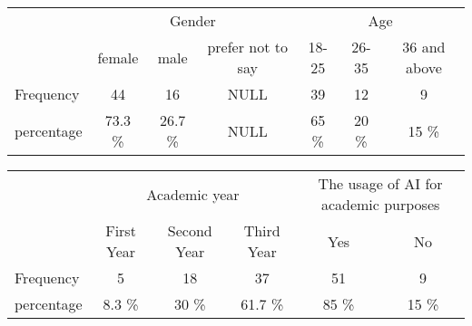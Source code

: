 \begin{table}[H]
	\begin{tabular}{l|ccc|ccc|}
		\cline{2-7}
		\multirow{2}{*}{}                & \multicolumn{3}{c|}{Gender}  & \multicolumn{3}{c|}{Age}                                                                                                                                            \\ \cline{2-7}
		                                 & \multicolumn{1}{c|}{female}  & \multicolumn{1}{c|}{male}    & \multicolumn{1}{c|}{prefer not to say} & \multicolumn{1}{c|}{18-25} & \multicolumn{1}{c|}{26-35} & \multicolumn{1}{c|}{36 and above} \\ \hline
		\multicolumn{1}{|l|}{Frequency}  & \multicolumn{1}{c|}{44}      & \multicolumn{1}{c|}{16}      & \multicolumn{1}{c|}{NULL}              & \multicolumn{1}{c|}{39}    & \multicolumn{1}{c|}{12}    & \multicolumn{1}{c|}{9}            \\ \hline
		\multicolumn{1}{|l|}{percentage} & \multicolumn{1}{c|}{73.3 \%} & \multicolumn{1}{c|}{26.7 \%} & \multicolumn{1}{c|}{NULL}              & \multicolumn{1}{c|}{65 \%} & \multicolumn{1}{c|}{20 \%} & \multicolumn{1}{c|}{15 \%}        \\ \hline
	\end{tabular}
\end{table}
\begin{table}[H]
	\begin{tabular}{l|ccc|cc|}
		\cline{2-6}
		\multirow{2}{*}{}                & \multicolumn{3}{c|}{Academic year} & \multicolumn{2}{c|}{The usage of AI for academic purposes}                                                                                             \\ \cline{2-6}
		                                 & \multicolumn{1}{c|}{First Year}    & \multicolumn{1}{c|}{Second Year}                           & \multicolumn{1}{c|}{Third Year} & \multicolumn{1}{c|}{Yes}   & \multicolumn{1}{c|}{No}    \\ \hline
		\multicolumn{1}{|l|}{Frequency}  & \multicolumn{1}{c|}{5}             & \multicolumn{1}{c|}{18}                                    & \multicolumn{1}{c|}{37}         & \multicolumn{1}{c|}{51}    & \multicolumn{1}{c|}{9}     \\ \hline
		\multicolumn{1}{|l|}{percentage} & \multicolumn{1}{c|}{8.3 \%}        & \multicolumn{1}{c|}{30 \%}                                 & \multicolumn{1}{c|}{61.7 \%}    & \multicolumn{1}{c|}{85 \%} & \multicolumn{1}{c|}{15 \%} \\ \hline
	\end{tabular}
\end{table}



